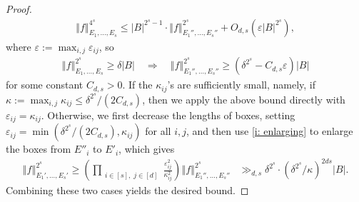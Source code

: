 \documentclass[11pt]{amsart}
\theoremstyle{definition}
\newcommand{\norm}[1]{\left\Vert #1\right\Vert}
\newcommand{\veps}{\varepsilon}
\newcommand{\brac}[1]{\mathopen{}\left( #1 \mathclose{}\right)}
\begin{document}
\begin{proof}
\begin{align*}
        \norm{f}_{E_1, \ldots, E_s}^{4^s}\leq |B|^{2^s-1}\cdot\norm{f}_{E_1'', \ldots, E_s''}^{2^s} + O_{d,s}(\veps|B|^{2^s}),
    \end{align*}
    where $\veps := \max_{i,j} \veps_{ij}$, so
    \begin{align*}
        \norm{f}_{E_1, \ldots, E_s}^{2^s}\geq \delta |B|\quad \Longrightarrow\quad \norm{f}_{E_1'', \ldots, E_s''}^{2^s} \geq (\delta^{2^s} - C_{d,s}\veps)|B|
    \end{align*}
    for some constant $C_{d,s}>0$.
    If the $\kappa_{ij}$'s are sufficiently small, namely, if $\kappa:=\max_{i,j}\kappa_{ij}\leq \delta^{2^s}/(2C_{d,s})$,
    then we apply the above bound directly with $\veps_{ij} = \kappa_{ij}$. Otherwise, we first decrease the lengths of boxes, setting $\veps_{ij}=\min(\delta^{2^s}/(2C_{d,s}),\kappa_{ij})$ for all $i,j$,
    and then use \eqref{i: enlarging} to enlarge the boxes from $E''_i$ to $E'_i$, which gives
    \begin{align*}
        \norm{f}_{E_1', \ldots, E_s'}^{2^s} \geq \brac{\prod_{\substack{i\in[s],\; j\in[d]}}\frac{\veps_{ij}^2}{\kappa_{ij}^2}}\norm{f}_{E_1'', \ldots, E_s''}^{2^s}&\gg_{d,s}\delta^{2^s}\cdot(\delta^{2^s}/\kappa)^{2ds}|B|.
    \end{align*}
    Combining these two cases yields the desired bound.


\end{proof}
\end{document}
